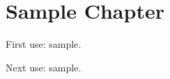 \documentclass{report}
\begin{document}
\chapter{Sample Chapter}

First use: \gls{sample}.

Next use: \gls{sample}.

\printglossaries
\end{document}
